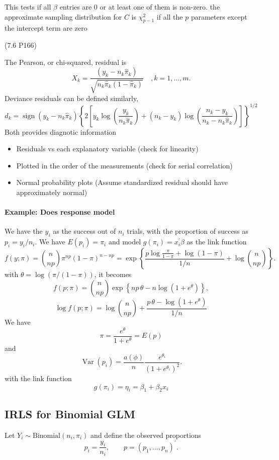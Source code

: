 \documentclass[11pt]{article}
\theoremstyle{definition}
\begin{document}
This tests if all $\beta$ entries are 0 or at least one of them is non-zero. the approximate sampling distribution for $C$ is $\chi^2_{p-1}$ if all the $p$ parameters except the intercept term are zero

(7.6 P166)

The Pearson, or chi-squared, residual is
$$
X_k=\frac{\left(y_k-n_k \widehat{\pi}_k\right)}{\sqrt{n_k \widehat{\pi}_k\left(1-\widehat{\pi}_k\right)}} \quad, k=1, \ldots, m .
$$
Deviance residuals can be defined similarly,
$$
d_k=\operatorname{sign}\left(y_k-n_k \widehat{\pi}_k\right)\left\{2\left[y_k \log \left(\frac{y_k}{n_k \widehat{\pi}_k}\right)+\left(n_k-y_k\right) \log \left(\frac{n_k-y_k}{n_k-n_k \widehat{\pi}_k}\right)\right]\right\}^{1 / 2}
$$
Both provides diagnotic information
\begin{itemize}
    \item Residuals vs each explanatory variable (check for linearity)
    \item Plotted in the order of the measurements (check for serial correlation)
    \item Normal probability plots (Assume standardized residual should have approximately normal)
\end{itemize}
\paragraph{Example: Does response model}
We have the $y_i$ as the success out of $n_i$ trials, with the proportion of success as $p_i = y_i/n_i$. We have $E(p_i) = \pi_i$ and model $g(\pi_i)=x_i^\prime\beta$ as the link function
\[
f(y;\pi)
=
\binom{n}{np}
\pi^{np}(1-\pi)^{n-np} = 
\exp\!\left\{
\frac{p\log\frac{\pi}{1-\pi}
+
\log(1-\pi)}{1/n}+ \log\binom{n}{np}
\right\}.
\]
with $\theta = \log(\pi/(1-\pi))$, it becomes
\[
f(p;\pi)
=
\binom{n}{np}
\exp\!\left\{
np\,\theta
-
n\log(1+e^{\theta})
\right\},
\]
\[
\log f(p;\pi)
=
\log\binom{n}{np}
+
\frac{p\,\theta
-
\log(1+e^{\theta})}{1/n}
\]
We have
$$
\pi = \frac{e^\theta}{1+e^\theta} = E(p)
$$
and
$$
\operatorname{Var}(p_i)
=
\frac{a(\phi)}{n}
\frac{e^{\theta_i}}{(1+e^{\theta_i})^2}.
$$
with the link function
\[
g(\pi_i) = \eta_i = \beta_1 + \beta_2x_i
\]
\subsection{IRLS for Binomial GLM}
Let $Y_i \sim \text{Binomial}(n_i,\pi_i)$ and define the observed
proportions
\[
p_i=\frac{y_i}{n_i}, \qquad
p=(p_1,\dots,p_n)^\prime .
\]
\end{document}
